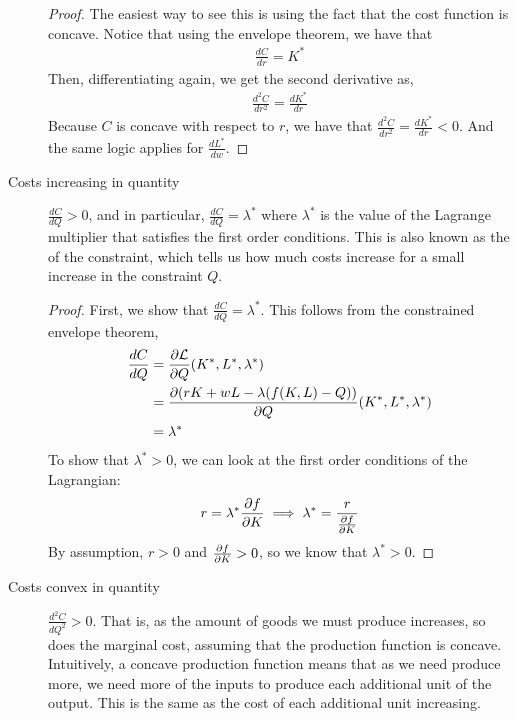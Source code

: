 \begin{description}
    \begin{proof}
        The easiest way to see this is using the fact that the cost function is concave. Notice that using the envelope theorem, we have that
        \begin{align*}
            \frac{dC}{dr} = K^*
        \end{align*}
        Then, differentiating again, we get the second derivative as,
        \begin{align*}
            \frac{d^2C}{dr^2} = \frac{dK^*}{dr}
        \end{align*}
        Because $C$ is concave with respect to $r$, we have that $\frac{d^2C}{dr^2} = \frac{dK^*}{dr} < 0$. And the same logic applies for $\frac{dL^*}{dw}$. 
    \end{proof}

    \item[Costs increasing in quantity] $\frac{dC}{dQ} > 0$, and in particular, $\frac{dC}{dQ} = \lambda^*$ where $\lambda^*$ is the value of the Lagrange multiplier that satisfies the first order conditions. This is also known as the  of the constraint, which tells us how much costs increase for a small increase in the constraint $Q$. 
    \begin{proof}
        First, we show that $\frac{dC}{dQ} = \lambda^*$. This follows from the constrained envelope theorem,
        \begin{align*}
            \frac{dC}{dQ} &= \frac{\partial \mathcal{L}}{\partial Q}(K^*, L^*, \lambda^*)\\
            &= \frac{\partial (rK + wL - \lambda(f(K, L) - Q))}{\partial Q}(K^*, L^*, \lambda^*) \\
            &= \lambda^*
        \end{align*}
        To show that $\lambda^* > 0$, we can look at the first order conditions of the Lagrangian:
        \begin{align*}
            r = \lambda^* \frac{\partial f}{\partial K} \implies \lambda^* = \frac{r}{\frac{\partial f}{\partial K}}
        \end{align*}
        By assumption, $r > 0$ and $\frac{\partial f}{\partial K} > 0$, so we know that $\lambda^* > 0$. 
    \end{proof} 

    \item[Costs convex in quantity] $\frac{d^2C}{dQ^2} > 0$. That is, as the amount of goods we must produce increases, so does the marginal cost, assuming that the production function is concave. Intuitively, a concave production function means that as we need produce more, we need more of the inputs to produce each additional unit of the output. This is the same as the cost of each additional unit increasing.
    

\end{description}
